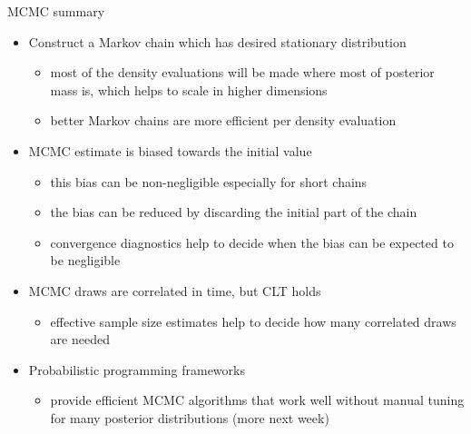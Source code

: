 \documentclass[finnish,english,t]{beamer}
\begin{document}
 \begin{frame}
   
   {\Large\color{navyblue} MCMC summary}

   \begin{itemize}
   \item<+-> Construct a Markov chain which has desired stationary distribution
     \begin{itemize}
     \item most of the density evaluations will be made where most of
       posterior mass is, which helps to scale in higher dimensions
     \item better Markov chains are more efficient per density
       evaluation
     \end{itemize}
   \item<+-> MCMC estimate is biased towards the initial value
     \begin{itemize}
     \item this bias can be non-negligible especially for short chains
     \item the bias can be reduced by discarding the initial part of the chain
     \item convergence diagnostics help to decide when the bias can be expected to be negligible
     \end{itemize}
   \item<+-> MCMC draws are correlated in time, but CLT holds
     \begin{itemize}
     \item effective sample size estimates help to decide how many
       correlated draws are needed
     \end{itemize}
   \item<+-> Probabilistic programming frameworks
     \begin{itemize}
     \item provide efficient MCMC algorithms that work well without
       manual tuning for many posterior distributions (more next week)
   \end{itemize}
 \end{itemize}
   
 \end{frame}
\end{document}
